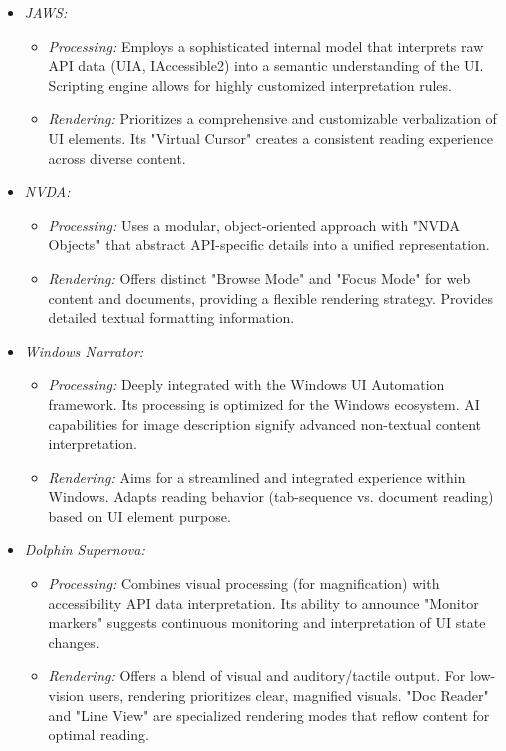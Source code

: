 \begin{itemize}
    \item \emph{JAWS:}
    \begin{itemize}
        \item \emph{Processing:} Employs a sophisticated internal model that interprets raw API data (UIA, IAccessible2) into a semantic understanding of the UI. Scripting engine allows for highly customized interpretation rules.\cite{JAWSInspect}
        \item \emph{Rendering:} Prioritizes a comprehensive and customizable verbalization of UI elements. Its "Virtual Cursor" creates a consistent reading experience across diverse content.\cite{JAWSKeyboardGestures}
    \end{itemize}
    \item \emph{NVDA:}
    \begin{itemize}
        \item \emph{Processing:} Uses a modular, object-oriented approach with "NVDA Objects" that abstract API-specific details into a unified representation.\cite{AssistivLabsNVDAArch}
        \item \emph{Rendering:} Offers distinct "Browse Mode" and "Focus Mode" for web content and documents, providing a flexible rendering strategy.\cite{NVDAKeyboardCommands} Provides detailed textual formatting information.
    \end{itemize}
    \item \emph{Windows Narrator:}
    \begin{itemize}
        \item \emph{Processing:} Deeply integrated with the Windows UI Automation framework. Its processing is optimized for the Windows ecosystem.\cite{NarratorTechDetails} AI capabilities for image description signify advanced non-textual content interpretation.\cite{NarratorImageDescriptions}
        \item \emph{Rendering:} Aims for a streamlined and integrated experience within Windows. Adapts reading behavior (tab-sequence vs. document reading) based on UI element purpose.\cite{NarratorTechDetails}
    \end{itemize}
    \item \emph{Dolphin Supernova:}
    \begin{itemize}
        \item \emph{Processing:} Combines visual processing (for magnification) with accessibility API data interpretation.\cite{SuperNovaFeatures} Its ability to announce "Monitor markers" suggests continuous monitoring and interpretation of UI state changes.
        \item \emph{Rendering:} Offers a blend of visual and auditory/tactile output. For low-vision users, rendering prioritizes clear, magnified visuals. "Doc Reader" and "Line View" are specialized rendering modes that reflow content for optimal reading.\cite{SuperNovaFeatures}
    \end{itemize}
\end{itemize}


